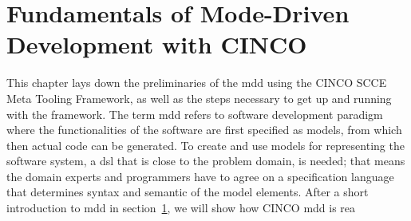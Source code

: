 
\chapter{Fundamentals of Mode-Driven Development with CINCO}\label{ch:Basis}

This chapter lays down the preliminaries of the \acrfull{mdd} using the CINCO SCCE Meta Tooling Framework, as well as the steps necessary to get up and running with the framework.
The term \acrshort{mdd} refers to software development paradigm where the functionalities of the software are first specified as models, from which then actual code can be generated.
To create and use models for representing the software system, a \acrfull{dsl} that is close to the problem domain, is needed; that means the domain experts and programmers have to agree on a specification language that determines syntax and semantic of the model elements.
After a short introduction to \acrfull{mdd} in section~\hyperref[]{1}, we will show how CINCO \acrshort{mdd} is rea
